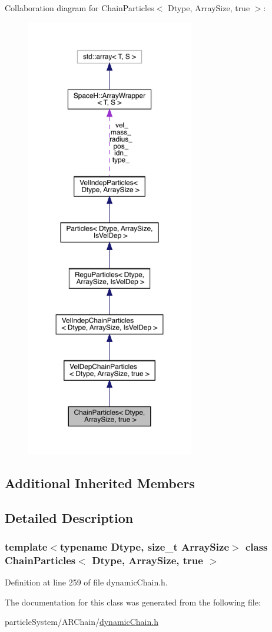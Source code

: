 Collaboration diagram for Chain\+Particles$<$ Dtype, Array\+Size, true $>$\+:
\nopagebreak
\begin{figure}[H]
\begin{center}
\leavevmode
\includegraphics[height=550pt]{class_chain_particles_3_01_dtype_00_01_array_size_00_01true_01_4__coll__graph}
\end{center}
\end{figure}
\subsection*{Additional Inherited Members}


\subsection{Detailed Description}
\subsubsection*{template$<$typename Dtype, size\+\_\+t Array\+Size$>$\newline
class Chain\+Particles$<$ Dtype, Array\+Size, true $>$}



Definition at line 259 of file dynamic\+Chain.\+h.



The documentation for this class was generated from the following file\+:\begin{DoxyCompactItemize}
\item 
particle\+System/\+A\+R\+Chain/\mbox{\hyperlink{dynamic_chain_8h}{dynamic\+Chain.\+h}}\end{DoxyCompactItemize}
